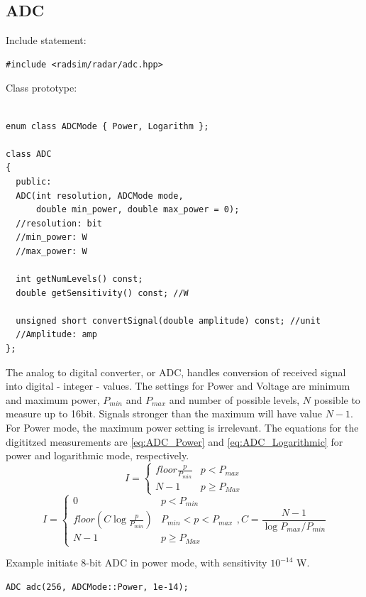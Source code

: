 \documentclass[letterpaper]{book}
\begin{document}
\subsection{ADC}
Include statement:
\begin{lstlisting}
#include <radsim/radar/adc.hpp>
\end{lstlisting}
Class prototype:
\begin{lstlisting}

enum class ADCMode { Power, Logarithm };

class ADC
{
  public:
  ADC(int resolution, ADCMode mode, 
      double min_power, double max_power = 0);
  //resolution: bit
  //min_power: W
  //max_power: W

  int getNumLevels() const;
  double getSensitivity() const; //W

  unsigned short convertSignal(double amplitude) const; //unit
  //Amplitude: amp
};
\end{lstlisting}
The analog to digital converter, or ADC, handles conversion of received signal into digital - integer - values. The settings for Power and Voltage are minimum and maximum power, \(P_{min}\) and \(P_{max}\) and number of possible levels, \(N\) possible to measure up to 16bit. Signals stronger than the maximum will have value \(N-1\). For Power mode, the maximum power setting is irrelevant. The equations for the digititzed measurements are \ref{eq:ADC_Power} and \ref{eq:ADC_Logarithmic} for power and logarithmic mode, respectively.
\begin{equation} \label{eq:ADC_Power}
I=\begin{cases}
      floor{\frac{p}{P_{min}}} & p < P_{max} \\
      N-1 & p \geq P_{Max}
   \end{cases}
\end{equation}
\begin{equation} \label{eq:ADC_Logarithmic}
I=\begin{cases}
      0 & p < P_{min} \\
      floor(C \log{\frac{p}{P_{min}}}) & P_{min} < p < P_{max} \\
      N-1 & p \geq P_{Max}
   \end{cases}, C=\frac{N-1}{\log{P_{max} / P_{min}}}
\end{equation}

Example initiate 8-bit ADC in power mode, with sensitivity \(10^{-14}\) W. 
\begin{lstlisting}
ADC adc(256, ADCMode::Power, 1e-14);
\end{lstlisting}
\end{document}
